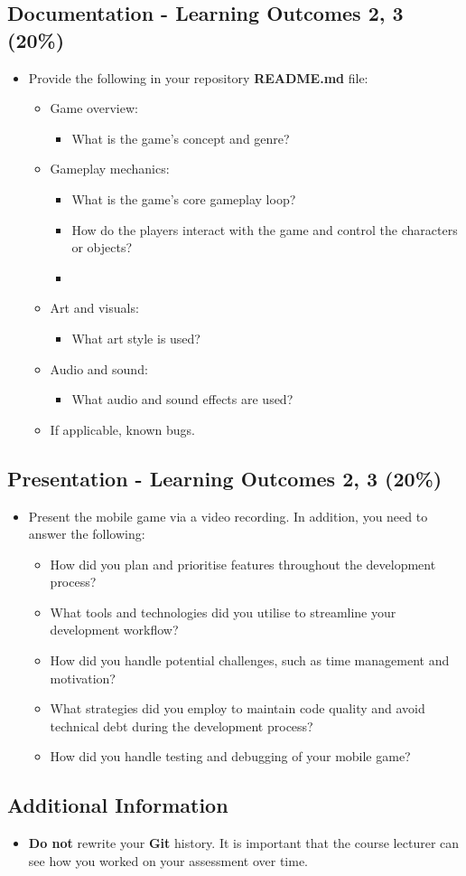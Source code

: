 \documentclass{article}
\begin{document}
\subsection*{Documentation - Learning Outcomes 2, 3 (20\%)}
\begin{itemize}
	\item Provide the following in your repository \textbf{README.md} file:
	\begin{itemize}
		\item Game overview:
		\begin{itemize}
			\item What is the game's concept and genre?
		\end{itemize}
		\item Gameplay mechanics:
		\begin{itemize}
			\item What is the game's core gameplay loop?
			\item How do the players interact with the game and control the characters or objects?
			\item 
		\end{itemize}
		\item Art and visuals:
		\begin{itemize}
			\item What art style is used?
		\end{itemize}
		\item Audio and sound:
		\begin{itemize}
			\item What audio and sound effects are used?
		\end{itemize}
		\item If applicable, known bugs.
	\end{itemize}
\end{itemize}

\subsection*{Presentation - Learning Outcomes 2, 3 (20\%)}
\begin{itemize}
	\item Present the mobile game via a video recording. In addition, you need to answer the following:
	\begin{itemize}
		\item How did you plan and prioritise features throughout the development process?
		\item What tools and technologies did you utilise to streamline your development workflow?
		\item How did you handle potential challenges, such as time management and motivation?
		\item What strategies did you employ to maintain code quality and avoid technical debt during the development process?
		\item How did you handle testing and debugging of your mobile game?
	\end{itemize}
\end{itemize}
\subsection*{Additional Information}
\begin{itemize}
	\item \textbf{Do not} rewrite your \textbf{Git} history. It is important that the course lecturer can see how you worked on your assessment over time.
\end{itemize}
\end{document}
